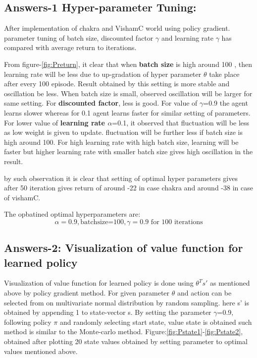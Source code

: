 \documentclass[preprint,12pt]{elsarticle}
\begin{document}
\subsection{Answers-1 Hyper-parameter Tuning:}
After implementation of chakra and VishamC world using policy gradient. parameter tuning of batch size, discounted factor $\gamma$ and learning rate $\gamma$ has compared with average return to iterations.


 
 From figure-\ref{fig:Preturn}, it clear that when\textbf{ batch size} is high around 100 , then learning rate will be less due to up-gradation of hyper parameter $\theta$ take place after every 100 episode. Result obtained by this setting is more stable and oscillation be less. When batch size is small, observed oscillation will be larger for same setting. For \textbf{discounted factor}, less is good. For value of $\gamma$=0.9 the agent learns slower whereas for 0.1 agent learns faster for similar setting of parameters. For lower value of \textbf{learning rate $\alpha$}=0.1, it observed that fluctuation will be less as low weight is given to update. fluctuation will be further less if batch size is high around 100. For high learning rate with high batch size, learning will be faster but higher learning rate with smaller batch size gives high oscillation in the result.
 
by such observation it is clear that setting of optimal hyper parameters gives after 50 iteration gives return of around -22 in case chakra and around -38 in case of vishamC.

The opbatined optimal hyperparameters are:
\begin{equation}
 \alpha =0.9 , 	\text{batchsize=100}, \gamma =0.9 \text{  for 100 iterations}
\end{equation}
 
 
 \subsection{Answers-2: Visualization of value function for learned policy}
Visualization of value function for learned policy is done using $\theta^T s'$ as mentioned above by policy gradient method. For given parameter $\theta$ and action can be selected from on multivariate normal distribution by random sampling. here s' is obtained by appending 1 to state-vector s. By setting the parameter $\gamma$=0.9, following policy $\pi$ and randomly selecting start state, value state is obtained such method is similar to the Monte-carlo method. Figure:\ref{fig:Pstate1}-\ref{fig:Pstate2}, obtained after plotting 20 state values obtained by setting parameter to optimal values mentioned above.
\end{document}
